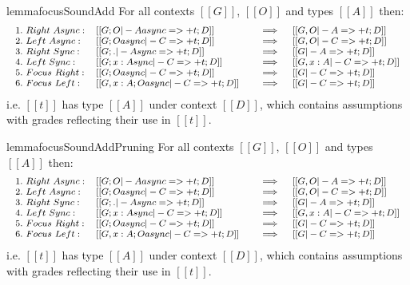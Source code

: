\begin{restatable}{lemma}{focusSoundAdd}
  \label{lemma:fAddSynthSound}
For all contexts $[[ G ]]$, $[[ O ]]$ and types $[[ A ]]$
then:
\begin{align*}
  {\footnotesize{
\begin{array}{lll}
 1.\ Right\ Async: & [[ G ; O |- A async =>+ t ; D ]] \quad &\implies \quad [[ G , O |- A =>+ t ; D ]]\\
 2.\ Left\ Async: & [[ G ; O async |- C =>+ t ; D ]] \quad &\implies \quad [[ G , O |- C =>+ t ; D ]]\\
 3.\ Right\ Sync: & [[ G ; . |- A sync =>+ t ; D ]] \quad &\implies \quad [[ G |- A =>+ t ; D ]]\\
 4.\ Left\ Sync: & [[ G ; {x : A }sync |- C =>+ t ; D ]] \quad &\implies \quad [[ G, x : A |- C =>+ t ; D ]]\\
 5.\ Focus\ Right: & [[ G ; O async |- C =>+ t ; D ]] \quad &\implies \quad [[ G |- C =>+ t ; D ]]\\
 6.\ Focus\ Left: & [[ G, x : A ; O async |- C =>+ t ; D ]] \quad &\implies \quad [[ G |- C =>+ t ; D ]]
\end{array}
  }}
\end{align*}
i.e. $[[ t ]]$ has type $[[ A ]]$
under context $[[ D ]]$,
which contains assumptions with grades reflecting their use in $[[ t ]]$.
\end{restatable}

\begin{restatable}{lemma}{focusSoundAddPruning}
\label{lemma:fAddPruningSynthSound}
For all contexts $[[ G ]]$, $[[ O ]]$ and types $[[ A ]]$
then:
\begin{align*}
  {\footnotesize{
\begin{array}{lll}
 1.\ Right\ Async: & [[ G ; O |- A async =>+ t ; D ]] \quad &\implies \quad [[ G , O |- A =>+ t ; D ]]\\
 2.\ Left\ Async: & [[ G ; O async |- C =>+ t ; D ]] \quad &\implies \quad [[ G , O |- C =>+ t ; D ]]\\
 3.\ Right\ Sync: & [[ G ; . |- A sync =>+ t ; D ]] \quad &\implies \quad [[ G |- A =>+ t ; D ]]\\
 4.\ Left\ Sync: & [[ G ; {x : A }sync |- C =>+ t ; D ]] \quad &\implies \quad [[ G, x : A |- C =>+ t ; D ]]\\
 5.\ Focus\ Right: & [[ G ; O async |- C =>+ t ; D ]] \quad &\implies \quad [[ G |- C =>+ t ; D ]]\\
 6.\ Focus\ Left: & [[ G, x : A ; O async |- C =>+ t ; D ]] \quad &\implies \quad [[ G |- C =>+ t ; D ]]
\end{array}
  }}
\end{align*}
i.e. $[[ t ]]$ has type $[[ A ]]$
under context $[[ D ]]$,
which contains assumptions with grades reflecting their use in $[[ t ]]$.
\end{restatable}


